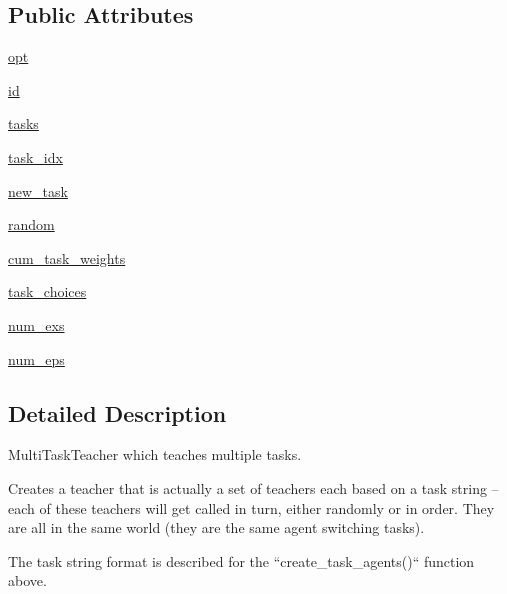\subsection*{Public Attributes}
\begin{DoxyCompactItemize}
\item 
\hyperlink{classparlai_1_1core_1_1agents_1_1MultiTaskTeacher_a116b724be9c512d36f1d43cb9be86b78}{opt}
\item 
\hyperlink{classparlai_1_1core_1_1agents_1_1MultiTaskTeacher_a875d7474eb3fcb0ff1b302db284ebf7b}{id}
\item 
\hyperlink{classparlai_1_1core_1_1agents_1_1MultiTaskTeacher_a5d284137aebeea42719984d60d3d72f6}{tasks}
\item 
\hyperlink{classparlai_1_1core_1_1agents_1_1MultiTaskTeacher_aff3455bc2af79f632214a4de2bad3d11}{task\+\_\+idx}
\item 
\hyperlink{classparlai_1_1core_1_1agents_1_1MultiTaskTeacher_a3a4f918f0ae0014eaae5cd2c6b14bc2e}{new\+\_\+task}
\item 
\hyperlink{classparlai_1_1core_1_1agents_1_1MultiTaskTeacher_a4bf83cc6d6e942b257ac249745bae007}{random}
\item 
\hyperlink{classparlai_1_1core_1_1agents_1_1MultiTaskTeacher_a1060c15dbbbe7fedfb89ba94969c5b99}{cum\+\_\+task\+\_\+weights}
\item 
\hyperlink{classparlai_1_1core_1_1agents_1_1MultiTaskTeacher_ae142e91e45c96fabf73d73639db3ab18}{task\+\_\+choices}
\item 
\hyperlink{classparlai_1_1core_1_1agents_1_1MultiTaskTeacher_ac4287538dada130117c19347765ac654}{num\+\_\+exs}
\item 
\hyperlink{classparlai_1_1core_1_1agents_1_1MultiTaskTeacher_ad3cdb9945ee238eff22fcbf5be5dfb16}{num\+\_\+eps}
\end{DoxyCompactItemize}


\subsection{Detailed Description}
\begin{DoxyVerb}MultiTaskTeacher which teaches multiple tasks.

Creates a teacher that is actually a set of teachers each based on a task
string -- each of these teachers will get called in turn,
either randomly or in order.  They are all in the same world (they are the
same agent switching tasks).

The task string format is described for the ``create_task_agents()``
function above.
\end{DoxyVerb}
 


